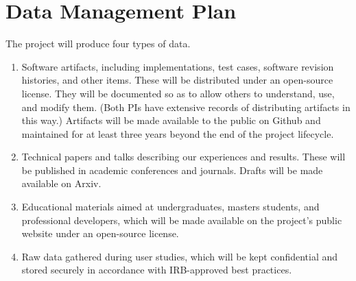 \section*{Data Management Plan}

The project will produce four types of data.

\begin{enumerate}
\item Software artifacts,
including implementations, test cases, software revision histories, and
other items.  These will be distributed under an open-source
license.  They will be documented so as to allow others to understand,
use, and modify them.  (Both PIs have extensive records of
distributing artifacts in this way.)  Artifacts will be made available
to the public on Github and maintained for at least three years beyond
the end of the project lifecycle.

\item Technical papers and talks describing our experiences
and results.  These will be published in academic conferences and journals.
Drafts will be made available on Arxiv.

\item Educational materials aimed at undergraduates, masters students,
and professional developers, which will be made available on the
project's public website under an open-source license.

\item Raw data gathered during user studies, which will be kept
confidential and stored securely in accordance with IRB-approved best
practices.
\end{enumerate}
